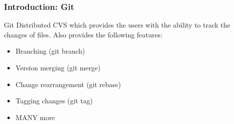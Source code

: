 \begin{frame}

\frametitle{Introduction: Git}

\begin{block}{Git}
Distributed CVS which provides the users with the ability to track the changes of files. Also provides the following features:
\begin{itemize}
\item Branching (git branch)
\item Version merging (git merge)
\item Change rearrangement (git rebase)
\item Tagging changes (git tag)
\item MANY more
\end{itemize}
\end{block}

\end{frame}

